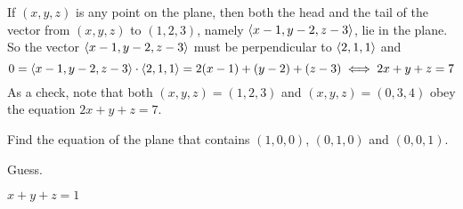 \begin{solution}
If $(x,y,z)$ is any point on the plane, then both the head and the tail of the vector from $(x,y,z)$ to $(1,2,3)$, namely $\left< x-1,y-2,z-3\right>$, lie in the plane. So the vector  $\left< x-1,y-2,z-3\right>$ must be perpendicular to 
$\left< 2,1,1\right>$ and
\begin{equation*}
0=\left< x-1,y-2,z-3\right>\cdot \left< 2,1,1\right> =2(x-1)+(y-2)+(z-3)
\iff 2x+y+z=7
\end{equation*}
As a check, note that both $(x,y,z)=(1,2,3)$ and $(x,y,z)=(0,3,4)$
obey the equation  $2x+y+z=7$.
\end{solution}

\begin{question}[M200 2008A] \label{prob1.4_planeeqn} %
Find the equation of the plane that contains $(1,0,0)$, 
$(0,1,0)$ and $(0,0,1)$.
\end{question}

\begin{hint}
Guess.
\end{hint}

\begin{answer}
$x+y+z=1$
\end{answer}

